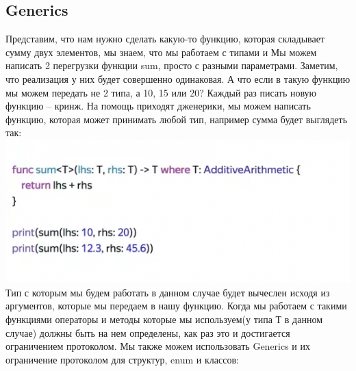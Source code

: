 \documentclass{article}
\begin{document}
    \subsection{Generics}
    Представим, что нам нужно сделать какую-то функцию, которая складывает сумму двух элементов, мы знаем, что мы работаем с типами  и 
    \newline
    Мы можем написать 2 перегрузки функции sum, просто с разными параметрами. 
    \newline
    Заметим, что реализация у них будет совершенно одинаковая. 
    \newline
    А что если в такую функцию мы можем передать не 2 типа, а 10, 15 или 20? Каждый раз писать новую функцию -- кринж. 
    \newline
    На помощь приходят дженерики, мы можем написать функцию, которая может принимать любой тип, например сумма будет выглядеть так: 
    \newline
    \includegraphics[scale = 0.5]{pic/Снимок экрана 2023-07-28 в 22.32.50.png}
    \newline
    Тип с которым мы будем работать в данном случае будет вычеслен исходя из аргументов, которые мы передаем в нашу функцию. 
    \newline
    Когда мы работаем с такими функциями операторы и методы которые мы используем(у типа Т в данном случае) должны быть на нем определены, как раз это и достигается ограничением протоколом. 
    \newline
    Мы также можем использовать Generics и их ограничение протоколом для структур, enum и классов: 
    \newline
\end{document}

